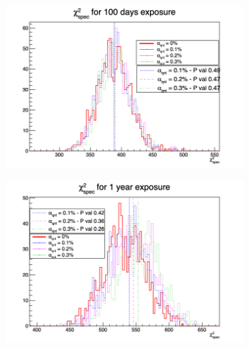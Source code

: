 \documentclass[../main.tex]{subfiles}
\begin{document}
\begin{figure}[th]
  \centering
  \begin{subfigure}[t]{0.48\linewidth}
    \includegraphics[width=\linewidth]{images/joint_fit/stat_tests/chi2_spec_100d.png}
  \end{subfigure}
  \begin{subfigure}[t]{0.48\linewidth}
    \includegraphics[width=\linewidth]{images/joint_fit/stat_tests/chi2_spec_1y.png}
  \end{subfigure}



\end{figure}
\end{document}

